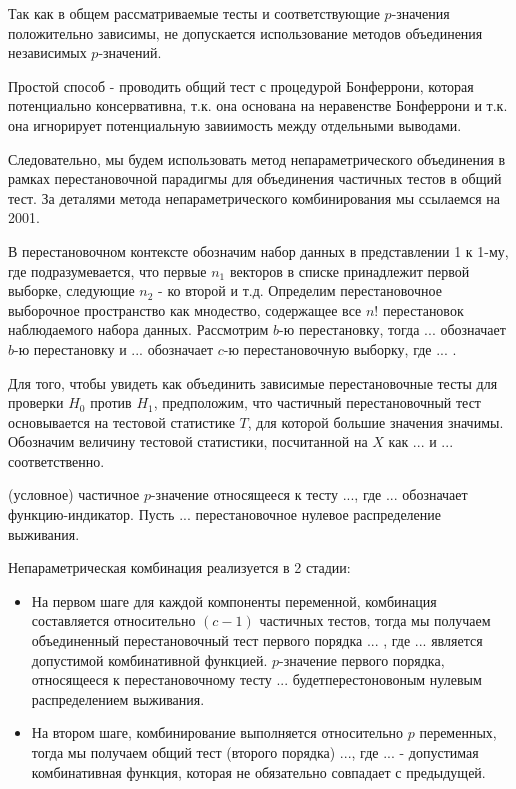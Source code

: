 \documentclass{article}
\begin{document}
Так как в общем рассматриваемые тесты и соответствующие $p$-значения положительно зависимы, не допускается использование методов объединения независимых $p$-значений.

Простой способ - проводить общий тест с процедурой Бонферрони, которая потенциально консервативна, т.к. она основана на неравенстве Бонферрони и т.к. она игнорирует потенциальную завиимость между отдельными выводами.

Следовательно, мы будем использовать метод непараметрического объединения в рамках перестановочной парадигмы для объединения частичных тестов в общий тест. За деталями метода непараметрического комбинирования мы ссылаемся на 2001.

В перестановочном контексте обозначим набор данных в представлении 1 к 1-му, где подразумевается, что первые $n_1$ векторов в списке принадлежит первой выборке, следующие $n_2$ - ко второй и т.д. Определим перестановочное выборочное пространство как мнодество, содержащее все $n!$ перестановок наблюдаемого набора данных. Рассмотрим $b$-ю перестановку, тогда ... обозначает $b$-ю перестановку и ... обозначает $c$-ю перестановочную выборку, где ... .

Для того, чтобы увидеть как объединить зависимые перестановочные тесты для проверки $H_0$ против $H_1$, предположим, что частичный перестановочный тест основывается на тестовой статистике $T$, для которой большие значения значимы. Обозначим величину тестовой статистики, посчитанной на $X$ как ... и ... соответственно.

(условное) частичное $p$-значение относящееся к тесту ..., где ... обозначает функцию-индикатор. Пусть ... перестановочное нулевое распределение выживания.

Непараметрическая комбинация реализуется в 2 стадии:
\begin{itemize}
  \item На первом шаге для каждой компоненты переменной, комбинация составляется относительно $(c-1)$ частичных тестов, тогда мы получаем объединенный перестановочный тест первого порядка ... , где ... является допустимой комбинативной функцией. $p$-значение первого порядка, относящееся к перестановочному тесту ... будетперестоновоным нулевым распределением выживания.

  \item На втором шаге, комбинирование выполняется относительно $p$ переменных, тогда мы получаем общий тест (второго порядка) ..., где ... - допустимая комбинативная функция, которая не обязательно совпадает с предыдущей.
\end{itemize}
\end{document}
